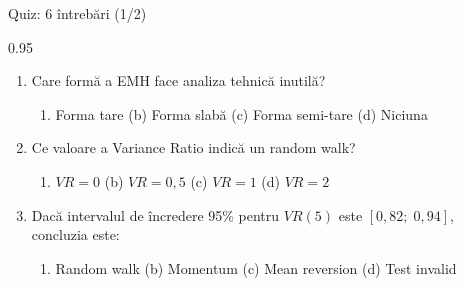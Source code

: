 \documentclass[9pt, aspectratio=169, t]{beamer}
\begin{document}
\begin{frame}[shrink=15]{Quiz: 6 întrebări (1/2)}
\begin{cminipage}{0.95\textwidth}
\begin{enumerate}\setlength{\itemsep}{0pt}
    \item Care formă a EMH face analiza tehnică inutilă?
    \begin{enumerate}\setlength{\itemsep}{0pt}
        \item[(a)] Forma tare \quad (b) Forma slabă \quad (c) Forma semi-tare \quad (d) Niciuna
    \end{enumerate}

    \vspace{0.15cm}
    \item Ce valoare a Variance Ratio indică un random walk?
    \begin{enumerate}\setlength{\itemsep}{0pt}
        \item[(a)] $VR = 0$ \quad (b) $VR = 0{,}5$ \quad (c) $VR = 1$ \quad (d) $VR = 2$
    \end{enumerate}

    \vspace{0.15cm}
    \item Dacă intervalul de încredere 95\% pentru $VR(5)$ este $[0{,}82;\;0{,}94]$, concluzia este:
    \begin{enumerate}\setlength{\itemsep}{0pt}
        \item[(a)] Random walk \quad (b) Momentum \quad (c) Mean reversion \quad (d) Test invalid
    \end{enumerate}
\end{enumerate}
\end{cminipage}
\end{frame}
\end{document}
